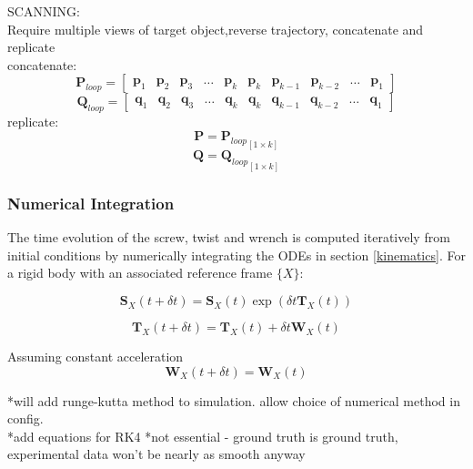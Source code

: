 SCANNING:\\
Require multiple views of target object,reverse trajectory, concatenate and replicate\\
concatenate:\\
\begin{equation}
	\mathbf{P}_{loop}= 
	\begin{bmatrix}
		\mathbf{p}_1 & \mathbf{p}_2 & \mathbf{p}_3 & \dots & \mathbf{p}_k &
		\mathbf{p}_{k} & \mathbf{p}_{k-1} & \mathbf{p}_{k-2} & \dots & \mathbf{p}_1
	\end{bmatrix}
\end{equation}
\begin{equation}
	\mathbf{Q}_{loop}= 
	\begin{bmatrix}
		\mathbf{q}_1 & \mathbf{q}_2 & \mathbf{q}_3 & \dots & \mathbf{q}_k &
		\mathbf{q}_{k} & \mathbf{q}_{k-1} & \mathbf{q}_{k-2} & \dots & \mathbf{q}_1
	\end{bmatrix}
\end{equation}
replicate:
\begin{equation}
	\mathbf{P} = {\mathbf{P}_{loop}}_{[1 \times k]}
\end{equation}
\begin{equation}
	\mathbf{Q} = {\mathbf{Q}_{loop}}_{[1 \times k]}
\end{equation}



\subsubsection{Numerical Integration}
The time evolution of the screw, twist and wrench is computed iteratively from initial conditions by numerically integrating the ODEs in section \ref{kinematics}. For a rigid body with an associated reference frame $\{X\}$:

\begin{equation}
	\mathbf{S}_X(t+\delta t) = \mathbf{S}_X(t)\exp({\delta t {\mathbf{T}_X(t)}})
\end{equation}

\begin{equation}
	\mathbf{T}_X(t+\delta t) = \mathbf{T}_X(t) + \delta t \mathbf{W}_X(t)
\end{equation}

Assuming constant acceleration
\begin{equation}
	\mathbf{W}_X(t+\delta t) =\mathbf{W}_X(t)
\end{equation}

*will add runge-kutta method to simulation. allow choice of numerical method in config.\\
*add equations for RK4 
*not essential - ground truth is ground truth, experimental data won't be nearly as smooth anyway

